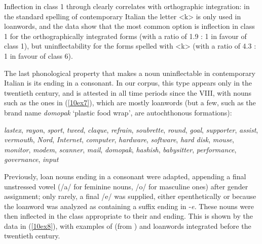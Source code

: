 \documentclass[output=paper,colorlinks,citecolor=brown]{langscibook}
\begin{document}
Inflection in class 1 through  clearly correlates with orthographic integration: in the standard spelling of contemporary Italian the letter \textless k\textgreater{} is only used in loanwords, and the data show that the most common option is inflection in class 1 for the orthographically integrated forms (with a ratio of 1.9 : 1 in favour of class 1), but uninflectability for the forms spelled with \textless k\textgreater{} (with a ratio of 4.3 : 1 in favour of class 6).

The last phonological property that makes a noun uninflectable in contemporary Italian is its ending in a consonant. In our corpus, this type appears only in the twentieth century, and is attested in all time periods since the VIII, with nouns such as the ones in (\ref{10ex7}), which are mostly loanwords (but a few, such as the brand name \emph{domopak} `plastic food wrap', are autochthonous formations):

\begin{exe}
	\ex \label{10ex7}
		\emph{lastex}, \emph{rayon}, \emph{sport}, \emph{tweed}, \emph{claque}, \emph{refrain}, \emph{soubrette}, \emph{round}, \emph{goal}, \emph{supporter}, \emph{assist}, \emph{vermouth}, \emph{Nord}, \emph{Internet}, \emph{computer}, \emph{hardware}, \emph{software}, \emph{hard disk}, \emph{mouse}, \emph{monitor}, \emph{modem}, \emph{scanner}, \emph{mail}, \emph{domopak}, \emph{hashish}, \emph{babysitter}, \emph{performance}, \emph{governance}, \emph{input}
\end{exe}

Previously, loan nouns ending in a consonant were adapted, appending a final unstressed vowel (/a/ for feminine nouns, /o/ for masculine ones) after gender assignment; only rarely, a final /e/ was supplied, either epenthetically or because the loanword was analyzed as containing a suffix ending in ‑\emph{e.} These nouns were then inflected in the class appropriate to their  and ending. This is shown by the data in (\ref{10ex8}), with examples of  (from \citealt{mancini1992}) and  loanwords integrated before the twentieth century.
\end{document}
